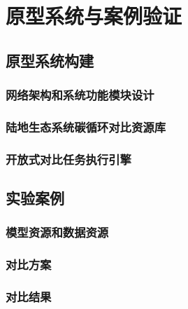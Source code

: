 \chapter{原型系统与案例验证}

\section{原型系统构建}
\subsection{网络架构和系统功能模块设计}
\subsection{陆地生态系统碳循环对比资源库}
\subsection{开放式对比任务执行引擎}

\section{实验案例}
\subsection{模型资源和数据资源}
\subsection{对比方案}
\subsection{对比结果}
